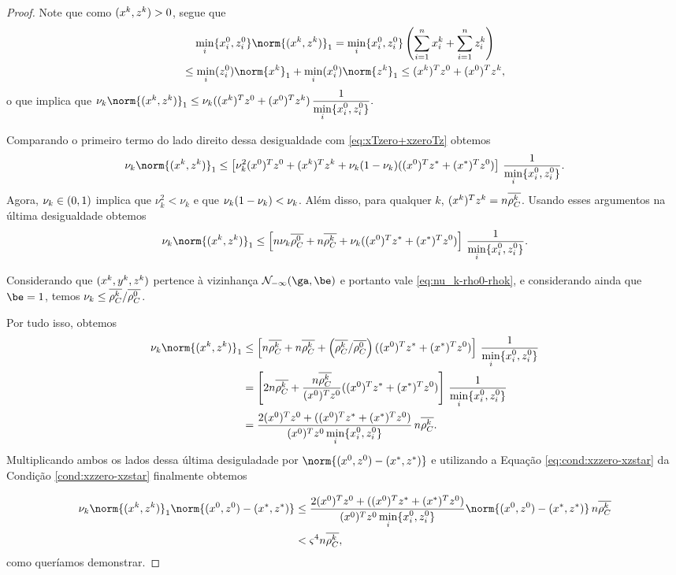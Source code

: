 \begin{proof}
Note que como  $(x^{k},z^{k})>0$, segue que 
\begin{multline*}
		\minxzinit\norm{(\xk,\zk)}_{1} = \minxzinit\left(\sum_{i=1}^{n}\xk_{i} + \sum_{i=1}^{n}\zk_{i} \right) \\ 
	 \leq \min_{i}(\zzero_{i})\norm{\xk}_{1} + \min_{i}(\xzero_{i})\norm{\zk}_{1}\leq
(\xk)^{T}\zzero + (\xzero)^{T}\zk,
\end{multline*}
o que implica que $
	\nuk \norm{(\xk,\zk)}_{1} \leq  \nuk ((\xk)^{T}\zzero + (\xzero)^{T}\zk)  \, \dfrac{1}{\minxzinit}.$

 Comparando o primeiro termo do lado direito dessa desigualdade com  \eqref{eq:xTzero+xzeroTz} obtemos 
\[
	\nuk \norm{(\xk,\zk)}_{1}  \leq\left[ \nuk ^{2}(\xzero)^T\zzero  + (\xk)^{T}\zk+  \nuk (1-\nuk )((\xzero)^{T}\zstar + (\xstar)^{T}\zzero)\right] \, \dfrac{1}{\minxzinit}. 
\]
Agora,   $\nu_{k} \in(0,1)$ implica que $\nu_{k}^{2}< \nu_{k}$ e que $\nu_{k} (1-\nu_{k} ) < \nu_{k} $. Além disso, para qualquer $k$, $(x^{k})^{T}z^{k} = n\overline{\rho_C^{k}} $.  Usando esses argumentos na última desigualdade obtemos
\[
	\nuk \norm{(\xk,\zk)}_{1} 	\leq \left[ n \nuk  \dbvec{\rho_C^0} + n\rhoCkb  + \nuk ((\xzero)^{T}\zstar + (\xstar)^{T}\zzero)\right] \, \dfrac{1}{\minxzinit}.  
\]

Considerando que $(x^{k},y^{k},z^{k})$ pertence à vizinhança $\Nset_{-\infty}(\ga,\be)$ e portanto vale  \eqref{eq:nu_k-rho0-rhok},  e considerando ainda que  $\be=1$, temos  $\nu_{k}   \leq  \overline{\rho_C^{k}} /\overline{\rho_C^0}$.  


Por tudo isso,  obtemos 
\[
	\begin{aligned}
		\nuk \norm{(\xk,\zk)}_{1}  & 	\leq \left[ n\rhoCkb  + n\rhoCkb  + \left(\rhoCkb /\dbvec{\rho_C^{0}}\right)((\xzero)^{T}\zstar + (\xstar)^{T}\zzero)\right] \, \dfrac{1}{\minxzinit} \\ 
								& =  \left[ 2n\rhoCkb  +\frac{n\rhoCkb }{(\xzero)^{T}\zzero}((\xzero)^{T}\zstar + (\xstar)^{T}\zzero)\right] \, \dfrac{1}{\minxzinit} \\ 
								& = \dfrac{ 2(\xzero)^{T}\zzero  + ((\xzero)^{T}\zstar + (\xstar)^{T}\zzero)} {(\xzero)^{T}\zzero \minxzinit} \, n\rhoCkb .
		\end{aligned}
\]
 Multiplicando  ambos os lados  dessa última desiguladade por $ \norm{(\xzero,\zzero) - (\xstar,\zstar)}$ e utilizando a Equação \eqref{eq:cond:xzzero-xzstar} da Condição \ref{cond:xzzero-xzstar} finalmente obtemos

\[
	\begin{aligned}
		\nuk \norm{(\xk,\zk)}_{1}\norm{(\xzero,\zzero) - (\xstar,\zstar)}  & \leq \dfrac{ 2(\xzero)^{T}\zzero  + ((\xzero)^{T}\zstar + (\xstar)^{T}\zzero)} {(\xzero)^{T}\zzero \minxzinit} \norm{(\xzero,\zzero) - (\xstar,\zstar)} \, n\rhoCkb  \\
					& < \bdxzstar^{4}n\rhoCkb ,
		\end{aligned}
\]
como queríamos demonstrar.
\end{proof}



